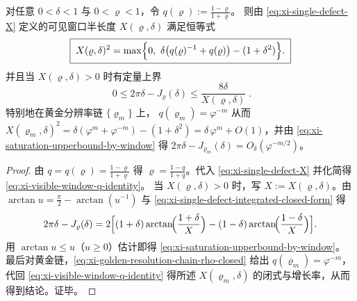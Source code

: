 

\begin{corollary}[黄金链上的可见窗口与饱和上界]\label{cor:xi-golden-window-saturation-upperbound}
对任意 \(0<\delta<1\) 与 \(0<\varrho<1\)，令
\(
q(\varrho):=\frac{1-\varrho}{1+\varrho}
\)。
则由 \eqref{eq:xi-single-defect-X} 定义的可见窗口半长度 \(X(\varrho,\delta)\) 满足恒等式
\begin{equation}\label{eq:xi-visible-window-q-identity}
\boxed{\;
X(\varrho,\delta)^2
=\max\Bigl\{0,\ \delta\bigl(q(\varrho)^{-1}+q(\varrho)\bigr)-(1+\delta^2)\Bigr\}. \;}
\end{equation}
并且当 \(X(\varrho,\delta)>0\) 时有定量上界
\begin{equation}\label{eq:xi-saturation-upperbound-by-window}
\boxed{\;
0\le 2\pi\delta-J_{\varrho}(\delta)\le \frac{8\delta}{X(\varrho,\delta)}\; }.
\end{equation}
特别地在黄金分辨率链 \(\{\varrho_m\}\) 上，
\(
q(\varrho_m)=\varphi^{-m}
\)
从而
\(
X(\varrho_m,\delta)^2=\delta(\varphi^m+\varphi^{-m})-(1+\delta^2)=\delta\,\varphi^m+O(1)
\)，并由 \eqref{eq:xi-saturation-upperbound-by-window} 得
\(
2\pi\delta-J_{\varrho_m}(\delta)=O_\delta(\varphi^{-m/2})
\)。
\end{corollary}

\begin{proof}
由 \(q=q(\varrho)=\frac{1-\varrho}{1+\varrho}\) 得 \(\varrho=\frac{1-q}{1+q}\)。代入 \eqref{eq:xi-single-defect-X} 并化简得 \eqref{eq:xi-visible-window-q-identity}。
当 \(X(\varrho,\delta)>0\) 时，写 \(X:=X(\varrho,\delta)\)。由 \(\arctan u=\frac{\pi}{2}-\arctan(u^{-1})\) 与 \eqref{eq:xi-single-defect-integrated-closed-form} 得
\[
2\pi\delta-J_{\varrho}(\delta)
=2\Bigl[(1+\delta)\arctan\!\Bigl(\frac{1+\delta}{X}\Bigr)
-(1-\delta)\arctan\!\Bigl(\frac{1-\delta}{X}\Bigr)\Bigr].
\]
用 \(\arctan u\le u\)（\(u\ge 0\)）估计即得 \eqref{eq:xi-saturation-upperbound-by-window}。
最后对黄金链，\eqref{eq:xi-golden-resolution-chain-rho-closed} 给出 \(q(\varrho_m)=\varphi^{-m}\)，代回 \eqref{eq:xi-visible-window-q-identity} 得所述 \(X(\varrho_m,\delta)\) 的闭式与增长率，从而得到结论。证毕。
\end{proof}




